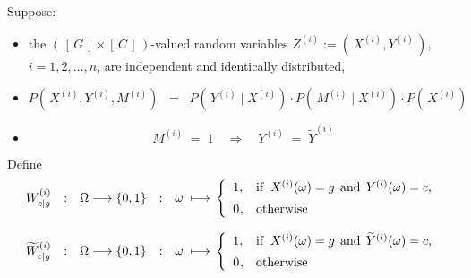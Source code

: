\vskip 0.3cm
\noindent
Suppose:
\begin{itemize}
\item
	the $\left(\,\left[\,G\,\right] \times \left[\,C\,\right]\,\right)$-valued random variables
	$Z^{(i)} := \left(\,X^{(i)},Y^{(i)}\,\right)$, $i = 1, 2, \ldots, n$, are independent and identically distributed,
\item
	\begin{equation*}
	P\!\left(\,X^{(i)},Y^{(i)},M^{(i)}\right)
	\;\; = \;\;
	P\!\left(\,Y^{(i)}\;\vert\;X^{(i)}\right) \cdot
	P\!\left(\,M^{(i)}\;\vert\;X^{(i)}\right) \cdot
	P\!\left(\,X^{(i)}\right)
	\end{equation*}
\item
	\begin{equation*}
	M^{(i)} \; = \; 1
	\quad\Longrightarrow\quad
	Y^{(i)} \; = \; \widetilde{Y}^{(i)}
	\end{equation*}
\end{itemize}
Define
\begin{equation*}
\begin{array}{ccccl}
	W^{(i)}_{c \vert g} &:& \Omega \longrightarrow \{0,1\} &:& \omega\;\longmapsto\,
	\left\{
		\begin{array}{cl}
		1, & \textnormal{if}\;\; X^{(i)}(\omega) = g \,\;\textnormal{and}\;\, Y^{(i)}(\omega) = c,
		\\
		\overset{{\color{white}-}}{0}, & \textnormal{otherwise}
		\end{array}
	\right.
\\ \\
	\widetilde{W}^{(i)}_{c \vert g} &:& \Omega \longrightarrow \{0,1\} &:& \omega\;\longmapsto\,
	\left\{
		\begin{array}{cl}
		1, & \textnormal{if}\;\; X^{(i)}(\omega) = g \,\;\textnormal{and}\;\, \widetilde{Y}^{(i)}(\omega) = c,
		\\
		\overset{{\color{white}-}}{0}, & \textnormal{otherwise}
		\end{array}
	\right.
\end{array}
\end{equation*}


